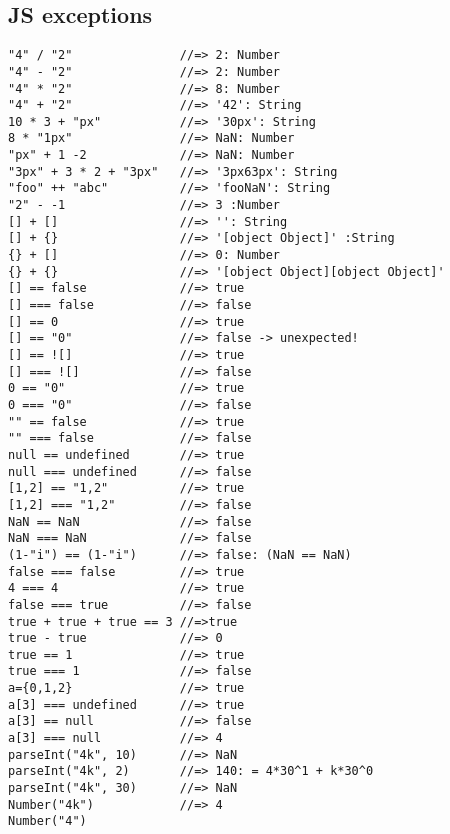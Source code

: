 \documentclass[main.tex,fontsize=6pt,paper=a4,paper=landscape,DIV=calc,]{scrartcl}
\begin{document}
\begin{multicols*}{4}
\section{JS exceptions}
\begin{lstlisting}
"4" / "2"               //=> 2: Number
"4" - "2"               //=> 2: Number
"4" * "2"               //=> 8: Number
"4" + "2"               //=> '42': String
10 * 3 + "px"           //=> '30px': String
8 * "1px"               //=> NaN: Number
"px" + 1 -2             //=> NaN: Number
"3px" + 3 * 2 + "3px"   //=> '3px63px': String
"foo" ++ "abc"          //=> 'fooNaN': String
"2" - -1                //=> 3 :Number
[] + []                 //=> '': String
[] + {}                 //=> '[object Object]' :String
{} + []                 //=> 0: Number
{} + {}                 //=> '[object Object][object Object]'
[] == false             //=> true
[] === false            //=> false
[] == 0                 //=> true
[] == "0"               //=> false -> unexpected!
[] == ![]               //=> true
[] === ![]              //=> false
0 == "0"                //=> true
0 === "0"               //=> false
"" == false             //=> true
"" === false            //=> false
null == undefined       //=> true
null === undefined      //=> false
[1,2] == "1,2"          //=> true
[1,2] === "1,2"         //=> false
NaN == NaN              //=> false
NaN === NaN             //=> false
(1-"i") == (1-"i")      //=> false: (NaN == NaN)
false === false         //=> true
4 === 4                 //=> true
false === true          //=> false
true + true + true == 3 //=>true 
true - true             //=> 0   
true == 1               //=> true
true === 1              //=> false
a={0,1,2}               //=> true
a[3] === undefined      //=> true
a[3] == null            //=> false
a[3] === null           //=> 4   
parseInt("4k", 10)      //=> NaN 
parseInt("4k", 2)       //=> 140: = 4*30^1 + k*30^0
parseInt("4k", 30)      //=> NaN
Number("4k")            //=> 4
Number("4")              
\end{lstlisting}

\end{multicols*}
\end{document}
